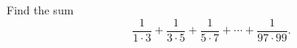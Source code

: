 Find the sum
\[\dfrac{1}{1\cdot3}+\dfrac{1}{3\cdot5}+\dfrac{1}{5\cdot7}+\cdots+\dfrac{1}{97\cdot99}.\]

